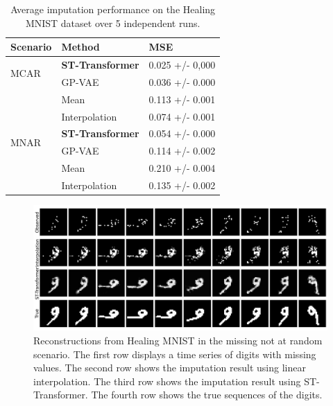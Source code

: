 \documentclass[review]{elsarticle}
\begin{document}
\begin{table}[h!]
    \centering
    \begin{tabularx}{\textwidth}{lXX}
        \toprule
        Scenario&Method & MSE \\
        \midrule
        \multirow{2}{*}{MCAR}&\textbf{ST-Transformer} & 0.025 +/- 0,000   \\

        &GP-VAE& 0.036 +/- 0.000\\
        &Mean&0.113 +/- 0.001\\
        &Interpolation&0.074 +/- 0.001\\
        
        \midrule
          \multirow{2}{*}{MNAR}&\textbf{ST-Transformer} & 0.054 +/- 0.000  \\
        &GP-VAE&0.114 +/- 0.002\\
        &Mean&0.210 +/- 0.004\\
        &Interpolation& 0.135 +/- 0.002\\
        \bottomrule

        
    \end{tabularx}
    \caption{Average imputation performance on the Healing MNIST dataset over 5 independent runs.}
    \label{tab: healing_mnist}
\end{table}





\begin{figure}[H]
\centering
\includegraphics[width=\textwidth]{figure/healing_mnist.png}
\caption{Reconstructions from Healing MNIST in the missing not at random scenario. The first row displays a time series of digits with missing values. The second row shows the imputation result using linear interpolation. The third row shows the imputation result using ST-Transformer. The fourth row shows the true sequences of the digits.}
\label{fig: healing_mnist}
\end{figure}
\end{document}
